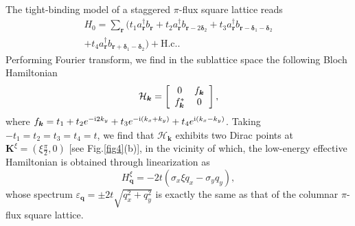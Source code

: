 \documentclass[aps, twocolumn, floatfix, superscriptaddress, prb]{revtex4-1}
\begin{document}
The tight-binding model of a staggered $\pi$-flux square lattice reads
%
\begin{equation} \label{H0_sta}
\begin{split}
{
H_0=\sum_{\bm r} (t_1 a_{\bm r}^\dagger b_{\bm r} + t_2 a_{\bm r}^\dagger b_{\bm r-2\bm \delta_2} + t_3 a_{\bm r}^\dagger b_{\bm r-\bm \delta_1 -\bm \delta_2}
}
\\
{
+ t_4 a_{\bm r}^\dagger b_{\bm r+\bm \delta_1 -\bm \delta_2}) +\text{H.c.}.
}
\end{split}
\end{equation}
%
Performing Fourier transform, we find in the sublattice space the following Bloch Hamiltonian
%
\begin{equation}\label{H0k_sta}
  {\cal H}_{\bm k} =\left\lbrack \begin{array}{cc}
0 & f_{\bm k} \\
  f_{\bm k}^* & 0
\end{array}\right\rbrack,
\end{equation}
%
where $f_{\bm k}=t_1+t_2e^{-{\rm i}2k_y } +t_3 e^{-{\rm i}\left(k_x +k_y \right)} +t_4 e^{{\rm i}\left(k_x-k_y \right)}$. Taking $-t_1=t_2=t_3=t_4=t$, we find that $\mathcal H_{\bm k}$ exhibits two Dirac points at {$\bm K^\xi=(\xi\tfrac{\pi}{2},0)$} [see Fig.\ref{fig4}(b)], in the vicinity of which, the low-energy effective Hamiltonian is obtained through linearization as
%
\begin{equation}
H_{\bm q}^\xi =-2t (\sigma_x \xi q_x -\sigma_y q_y),
\end{equation}
%
whose spectrum $\varepsilon_{\bm q}=\pm2t\sqrt{q_x^2+q_y^2}$ is exactly the same as that of the columnar $\pi$-flux square lattice.
\end{document}
